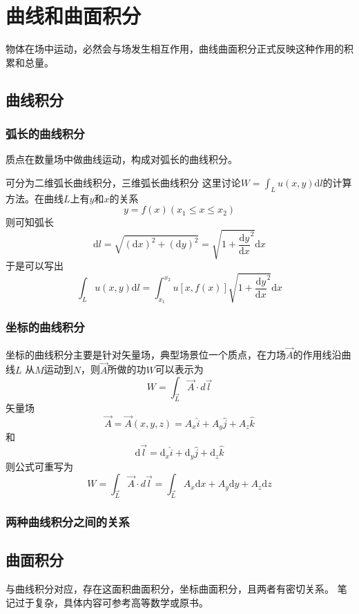 \chapter{曲线和曲面积分}\label{chapter_5}
物体在场中运动，必然会与场发生相互作用，曲线曲面积分正式反映这种作用的积累和总量。
\section{曲线积分}
\subsection{弧长的曲线积分}
质点在数量场中做曲线运动，构成对弧长的曲线积分。

可分为二维弧长曲线积分，三维弧长曲线积分
这里讨论$ W=\int_{L} u(x,y) \mathrm{d}l$的计算方法。在曲线$ L $上有$ y $和$ x $的关系
\[
y=f(x)	(x_1\leq x\leq x_2)
\]
则可知弧长
\[
\mathrm{d}l=\sqrt{(\mathrm{d}x)^2+(\mathrm{d}y)^2}=\sqrt{1+\frac{\mathrm{d}y}{\mathrm{d}x}^2}\mathrm{d}x
\]
于是可以写出
\[
\int_{L} u(x,y) \mathrm{d}l=\int_{x_1}^{x_2}u[x,f(x)]\sqrt{1+\frac{\mathrm{d}y}{\mathrm{d}x}^2}\mathrm{d}x
\]
%
\subsection{坐标的曲线积分}
坐标的曲线积分主要是针对矢量场，典型场景位一个质点，在力场$ \vec{A} $的作用线沿曲线$ L $ 从$ M $运动到$ N $，则$ \vec{A} $所做的功$ W $可以表示为
\[ W=\int_{\vec{L}} \vec{A}\cdot d\vec{l}
 \]
矢量场
\[
\vec{A}=\vec{A}(x,y,z)=A_x\hat{i}+A_y\hat{j}+A_z\hat{k}
\]
和
\[
\mathrm{d}\vec{l}=\mathrm{d}_x\hat{i}+\mathrm{d}_y\hat{j}+\mathrm{d}_z\hat{k}
\]
则公式可重写为
\[ 
W=\int_{\vec{L}} \vec{A}\cdot d\vec{l}=\int_{\vec{L}}A_x\mathrm{d}x+A_y\mathrm{d}y+A_z\mathrm{d}z
\]

\subsection{两种曲线积分之间的关系}


\section{曲面积分}
与曲线积分对应，存在这面积曲面积分，坐标曲面积分，且两者有密切关系。
笔记过于复杂，具体内容可参考高等数学或原书。

